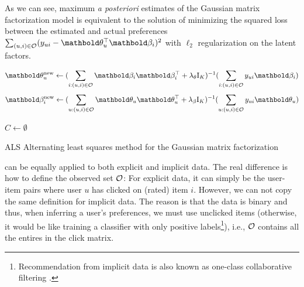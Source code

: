 As we can see, maximum \emph{a posteriori} estimates of the Gaussian matrix factorization model is equivalent to the solution of minimizing the squared loss between the estimated and actual preferences $\sum_{(u, i)\in \mathcal{O}} (y_{ui} - \mb\theta_u^\top\mb\beta_i)^2$ with $\ell_2$ regularization on the latent factors.


\begin{equation}
\mb\theta_u^\new \leftarrow (\sum_{i: (u, i) \in \cO} \mb\beta_i \mb\beta_i^\top + \lambda_\theta \mathrm{I}_K)^{-1} (\sum_{i: (u, i) \in \cO} y_{ui} \mb\beta_i)
\label{chpt:background:eq:als_user}
\end{equation}
\begin{equation}
\mb\beta_i^\new \leftarrow (\sum_{u: (u, i)\in\cO} \mb\theta_u \mb\theta_u^\top + \lambda_\beta \mathrm{I}_K)^{-1} (\sum_{u: (u, i)\in\cO} y_{ui} \mb\theta_u)
\label{chpt:background:eq:als_item}
\end{equation}

\begin{algorithm}
\DontPrintSemicolon %
$C \gets \emptyset$\;
\;
\caption{{\sc ALS} Alternating least squares method for the Gaussian matrix factorization}
\label{chpt:background:algo:gmf}
\end{algorithm}

  can be equally applied to both explicit and implicit data. The real difference is how to define the observed set $\mathcal{O}$: For explicit data, it can simply be the user-item pairs where user $u$ has clicked on (rated) item $i$. However, we can not copy the same definition for implicit data. The reason is that the data is binary and thus, when inferring a user's preferences, we must use unclicked items (otherwise, it would be like training a classifier with only positive labels\footnote{Recommendation from implicit data is also known as one-class collaborative filtering \citep{pan2008one}.}), i.e., $\mathcal{O}$ contains all the entires in the click matrix. 

